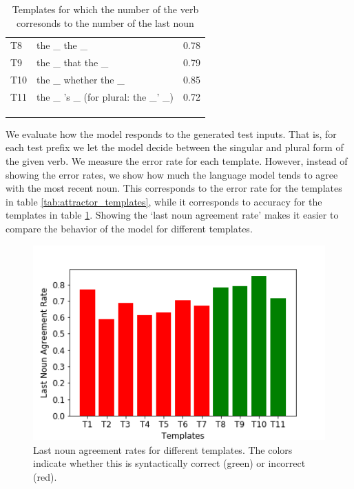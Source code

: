 \begin{table}
\parbox{\linewidth}{
\centering
\begin{tabular}{ l l r }
  T8    & the \_ the \_         &  0.78\\
  T9    & the \_ that the \_    &  0.79\\
  T10   & the \_ whether the \_ &  0.85\\
  T11   & the \_ 's \_ (for plural: the \_' \_)          &  0.72 \\
\\
\\
\\
\end{tabular}
\caption{Templates for which the number of the verb 
corresonds to the number of the last noun} 
\label{tab:lastnoun_templates}
}
\end{table}


We evaluate how the model responds to the generated test inputs.
That is, for each test prefix we let the model decide between 
the singular and plural form of the given verb. 
We measure the error rate for each template.
However, instead of showing the error rates, we
show how much the language model tends to agree with the most recent noun.
This corresponds to the error rate for the templates in table \ref{tab:attractor_templates},
while it corresponds to accuracy for the templates in table \ref{tab:lastnoun_templates}.
Showing the `last noun agreement rate' makes it easier
to compare the behavior of the model for different templates.

\begin{figure}
    \centering
\includegraphics[scale=0.5]{syntactic_templates} 
\caption{Last noun agreement rates for different templates.
The colors indicate whether this is syntactically correct (green)
or incorrect (red).
}
\label{fig:last_noun_rates}
\end{figure}


